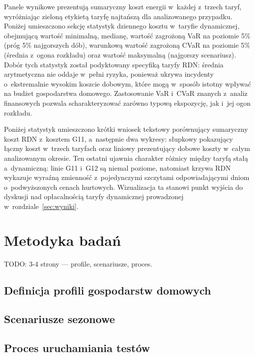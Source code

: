 \documentclass[12pt,twoside]{article}
\begin{document}
Panele wynikowe prezentują sumaryczny koszt energii w~każdej z~trzech taryf, wyróżniając zieloną etykietą taryfę najtańszą dla analizowanego przypadku. Poniżej umieszczono sekcję statystyk dziennego kosztu w~taryfie dynamicznej, obejmującą wartość minimalną, medianę, wartość zagrożoną VaR na poziomie 5\% (próg 5\% najgorszych dób), warunkową wartość zagrożoną CVaR na poziomie 5\% (średnia z~ogona rozkładu) oraz wartość maksymalną (najgorszy scenariusz). Dobór tych statystyk został podyktowany specyfiką taryfy RDN: średnia arytmetyczna nie oddaje w~pełni ryzyka, ponieważ ukrywa incydenty o~ekstremalnie wysokim koszcie dobowym, które mogą w~sposób istotny wpływać na budżet gospodarstwa domowego. Zastosowanie VaR i~CVaR znanych z~analiz finansowych pozwala scharakteryzować zarówno typową ekspozycję, jak i~jej ogon rozkładu.

Poniżej statystyk umieszczono krótki wniosek tekstowy porównujący sumaryczny koszt RDN z~kosztem G11, a~następnie dwa wykresy: słupkowy pokazujący łączny koszt w~trzech taryfach oraz liniowy prezentujący dobowe koszty w~całym analizowanym okresie. Ten ostatni ujawnia charakter różnicy między taryfą stałą a~dynamiczną: linie G11 i~G12 są niemal poziome, natomiast krzywa RDN wykazuje wyraźną zmienność z~pojedynczymi szczytami odpowiadającymi dniom o~podwyższonych cenach hurtowych. Wizualizacja ta stanowi punkt wyjścia do dyskusji nad opłacalnością taryfy dynamicznej prowadzonej w~rozdziale~\ref{sec:wyniki}.


\section{Metodyka badań}

TODO: 3-4 strony — profile, scenariusze, proces.

\subsection{Definicja profili gospodarstw domowych}
\subsection{Scenariusze sezonowe}
\subsection{Proces uruchamiania testów}
\end{document}

